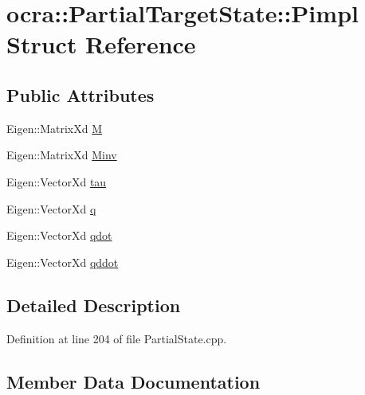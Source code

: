 \hypertarget{structocra_1_1PartialTargetState_1_1Pimpl}{}\section{ocra\+:\+:Partial\+Target\+State\+:\+:Pimpl Struct Reference}
\label{structocra_1_1PartialTargetState_1_1Pimpl}
\subsection*{Public Attributes}
\begin{DoxyCompactItemize}
\item 
Eigen\+::\+Matrix\+Xd \hyperlink{structocra_1_1PartialTargetState_1_1Pimpl_acf8d5f65cf416eda2285044fb31e16dd}{M}
\item 
Eigen\+::\+Matrix\+Xd \hyperlink{structocra_1_1PartialTargetState_1_1Pimpl_a14905360b00dea81b81fd48960fbe7a5}{Minv}
\item 
Eigen\+::\+Vector\+Xd \hyperlink{structocra_1_1PartialTargetState_1_1Pimpl_a68194144a3fdbdb73744178332101ed0}{tau}
\item 
Eigen\+::\+Vector\+Xd \hyperlink{structocra_1_1PartialTargetState_1_1Pimpl_a0d72ffd9b45ff335dee37874459dfc8d}{q}
\item 
Eigen\+::\+Vector\+Xd \hyperlink{structocra_1_1PartialTargetState_1_1Pimpl_a788a4c8818c07f7cd401d3a7cf1cf5c4}{qdot}
\item 
Eigen\+::\+Vector\+Xd \hyperlink{structocra_1_1PartialTargetState_1_1Pimpl_ae9c10dd0f603be49ec43fdf69f8d6556}{qddot}
\end{DoxyCompactItemize}


\subsection{Detailed Description}


Definition at line 204 of file Partial\+State.\+cpp.



\subsection{Member Data Documentation}
\hypertarget{structocra_1_1PartialTargetState_1_1Pimpl_acf8d5f65cf416eda2285044fb31e16dd}{}\label{structocra_1_1PartialTargetState_1_1Pimpl_acf8d5f65cf416eda2285044fb31e16dd} 
